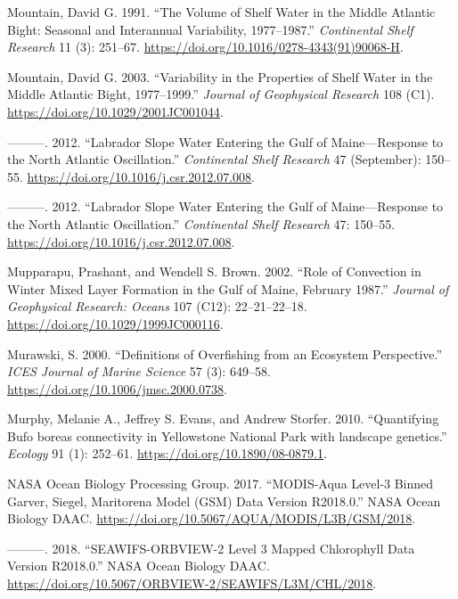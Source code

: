 \documentclass[
]{book}
\begin{document}
\leavevmode\hypertarget{ref-mountain1991}{}%
Mountain, David G. 1991. ``The Volume of Shelf Water in the Middle Atlantic Bight: Seasonal and Interannual Variability, 1977--1987.'' \emph{Continental Shelf Research} 11 (3): 251--67. \url{https://doi.org/10.1016/0278-4343(91)90068-H}.

\leavevmode\hypertarget{ref-mountain_variability_2003}{}%
Mountain, David G. 2003. ``Variability in the Properties of Shelf Water in the Middle Atlantic Bight, 1977--1999.'' \emph{Journal of Geophysical Research} 108 (C1). \url{https://doi.org/10.1029/2001JC001044}.

\leavevmode\hypertarget{ref-mountain_labrador_2012}{}%
---------. 2012. ``Labrador Slope Water Entering the Gulf of Maine---Response to the North Atlantic Oscillation.'' \emph{Continental Shelf Research} 47 (September): 150--55. \url{https://doi.org/10.1016/j.csr.2012.07.008}.

\leavevmode\hypertarget{ref-mountain2012}{}%
---------. 2012. ``Labrador Slope Water Entering the Gulf of Maine---Response to the North Atlantic Oscillation.'' \emph{Continental Shelf Research} 47: 150--55. \url{https://doi.org/10.1016/j.csr.2012.07.008}.

\leavevmode\hypertarget{ref-mupparapu_role_2002}{}%
Mupparapu, Prashant, and Wendell S. Brown. 2002. ``Role of Convection in Winter Mixed Layer Formation in the Gulf of Maine, February 1987.'' \emph{Journal of Geophysical Research: Oceans} 107 (C12): 22--21--22--18. \url{https://doi.org/10.1029/1999JC000116}.

\leavevmode\hypertarget{ref-murawski_definitions_2000}{}%
Murawski, S. 2000. ``Definitions of Overfishing from an Ecosystem Perspective.'' \emph{ICES Journal of Marine Science} 57 (3): 649--58. \url{https://doi.org/10.1006/jmsc.2000.0738}.

\leavevmode\hypertarget{ref-Murphy2010}{}%
Murphy, Melanie A., Jeffrey S. Evans, and Andrew Storfer. 2010. ``Quantifying Bufo boreas connectivity in Yellowstone National Park with landscape genetics.'' \emph{Ecology} 91 (1): 252--61. \url{https://doi.org/10.1890/08-0879.1}.

\leavevmode\hypertarget{ref-NASA2}{}%
NASA Ocean Biology Processing Group. 2017. ``MODIS-Aqua Level-3 Binned Garver, Siegel, Maritorena Model (GSM) Data Version R2018.0.'' NASA Ocean Biology DAAC. \url{https://doi.org/10.5067/AQUA/MODIS/L3B/GSM/2018}.

\leavevmode\hypertarget{ref-NASA1}{}%
---------. 2018. ``SEAWIFS-ORBVIEW-2 Level 3 Mapped Chlorophyll Data Version R2018.0.'' NASA Ocean Biology DAAC. \url{https://doi.org/10.5067/ORBVIEW-2/SEAWIFS/L3M/CHL/2018}.
\end{document}
